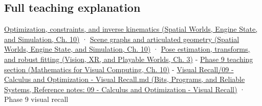 \subsection{Full teaching explanation}\label{appendix-29f4bea4c2bb-full-teaching-explanation}

\href{../05-Spatial-Worlds-Engine-State-and-Simulation/main.pdf\#nameddest=04-visual-computing-ii-ch029-optimization-constraints-and-inverse-kinematics}{Optimization, constraints, and inverse kinematics (Spatial Worlds, Engine State, and Simulation, Ch. 10)} · \href{../05-Spatial-Worlds-Engine-State-and-Simulation/main.pdf\#nameddest=04-visual-computing-ii-ch029-scene-graphs-and-articulated-geometry}{Scene graphs and articulated geometry (Spatial Worlds, Engine State, and Simulation, Ch. 10)} · \href{../07-Vision-XR-and-Playable-Worlds/main.pdf\#nameddest=04-visual-computing-ii-ch032-pose-estimation-transforms-and-robust-fitting}{Pose estimation, transforms, and robust fitting (Vision, XR, and Playable Worlds, Ch. 3)} - \href{../02-Mathematics-for-Visual-Computing/main.pdf\#nameddest=02-foundations-ii-ch026-optimization-and-inverse-problems}{Phase 9 teaching section (Mathematics for Visual Computing, Ch. 10)} - \href{../01-Bits-Programs-and-Reliable-Systems/main.pdf\#nameddest=appendix-adf48f5dc5c1}{Visual Recall/09 - Calculus and Optimization - Visual Recall.md (Bits, Programs, and Reliable Systems, Reference notes: 09 - Calculus and Optimization - Visual Recall)} · Phase 9 visual recall
